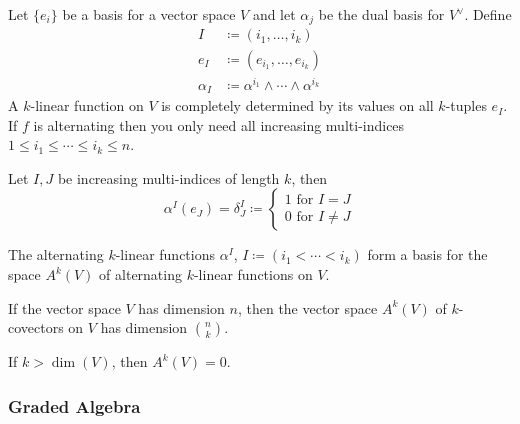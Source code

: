 Let \(\{e_i\}\) be a basis for a vector space \(V\) and let \(\alpha_j\) be the dual basis for \(V^\vee\).
%
Define 
%
\begin{equation}
    \begin{split}
        I &\coloneqq (i_1, \dots, i_k)  \\
        e_I &\coloneqq (e_{i_1}, \dots, e_{i_k})  \\
        \alpha_I &\coloneqq \alpha^{i_1} \wedge \cdots \wedge \alpha^{i_k}
    \end{split}
\end{equation}
%
A \(k\)-linear function on \(V\) is completely determined by its values on all \(k\)-tuples \(e_I\).
%
If \(f\) is alternating then you only need all increasing multi-indices \(1 \leq i_1 \leq \cdots \leq i_k \leq n\).
%
\begin{lemma}{}{}
    Let \(I, J\) be increasing multi-indices of length \(k\), then
    \begin{equation}
        \alpha^I(e_J) = \delta_J^I \coloneqq \begin{cases}
            1 \text{ for } I = J \\
            0 \text{ for } I \neq J
        \end{cases}
    \end{equation}
\end{lemma}
%
\begin{proposition}{}{}
    The alternating \(k\)-linear functions \(\alpha^I\), \(I \coloneqq (i_1 < \cdots < i_k)\) form a basis for the space \(A^k(V)\) of alternating \(k\)-linear functions on \(V\).
\end{proposition}
%
\begin{corollary}{}{}
    If the vector space \(V\) has dimension \(n\), then the vector space \(A^k(V)\) of \(k\)-covectors on \(V\) has dimension \(n \choose k\).
\end{corollary}
%
\begin{corollary}{}{}
    If \(k > \dim(V)\), then \(A^k(V) = 0\).
\end{corollary}


\subsubsection{Graded Algebra}

\newcommand{\gradedA}{A = \bigoplus_k A^k}


